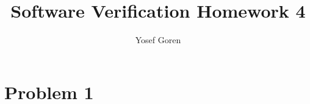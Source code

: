 \documentclass{article}
\begin{document}
\author{Yosef Goren}
\title{Software Verification Homework 4}
\section{Problem 1}
\subsection{}
\maketitle
\end{document}
